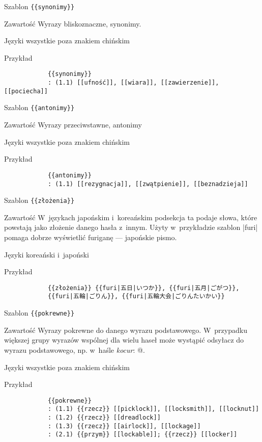 \spacer
\begin{opis}
	\item[Szablon] \verb|{{synonimy}}|
	\item[Zawartość] Wyrazy bliskoznaczne, synonimy.
	\item[Języki] wszystkie poza znakiem chińskim
	\item[Przykład]
		\begin{verbatim}
			{{synonimy}}
			: (1.1) [[ufność]], [[wiara]], [[zawierzenie]], [[pociecha]]
		\end{verbatim}
\end{opis}
\spacer
\begin{opis}
	\item[Szablon] \verb|{{antonimy}}|
	\item[Zawartość] Wyrazy przeciwstawne, antonimy
	\item[Języki] wszystkie poza znakiem chińskim
	\item[Przykład]
		\begin{verbatim}
			{{antonimy}}
			: (1.1) [[rezygnacja]], [[zwątpienie]], [[beznadzieja]]
		\end{verbatim}
\end{opis}
\spacer
\begin{opis}
	\item[Szablon] \verb|{{złożenia}}|
	\item[Zawartość] W~językach japońskim i~koreańskim podsekcja ta podaje słowa, które powstają jako złożenie danego hasła z~innym. Użyty w~przykładzie szablon \kod|{{furi}}| pomaga dobrze wyświetlić furiganę --- japońskie pismo.
	\item[Języki] koreański i~japoński
	\item[Przykład]
		\begin{verbatim}
			{{złożenia}} {{furi|五日|いつか}}, {{furi|五月|ごがつ}},
			{{furi|五輪|ごりん}}, {{furi|五輪大会|ごりんたいかい}}
		\end{verbatim}
\end{opis}
\spacer
\begin{opis}
	\item[Szablon] \verb|{{pokrewne}}|
	\item[Zawartość] Wyrazy pokrewne do danego wyrazu podstawowego. W~przypadku większej grupy wyrazów wspólnej dla wielu haseł może wystąpić odsyłacz do wyrazu podstawowego, np. w~haśle \emph{kocur}: @.
	\item[Języki] wszystkie poza znakiem chińskim
	\item[Przykład]
		\begin{verbatim}
			{{pokrewne}}
			: (1.1) {{rzecz}} [[picklock]], [[locksmith]], [[locknut]]
			: (1.2) {{rzecz}} [[dreadlock]]
			: (1.3) {{rzecz}} [[airlock]], [[lockage]]
			: (2.1) {{przym}} [[lockable]]; {{rzecz}} [[locker]]
		\end{verbatim}
\end{opis}
